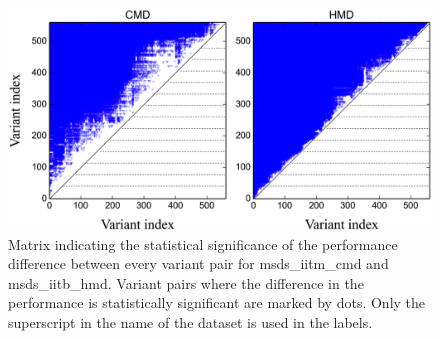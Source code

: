 \begin{figure}
	\begin{center}
		\includegraphics[width=\figSizeEightyFive]{ch06_patterns/figures/SimilarityEvaluation/StatisticalDiff.png}
	\end{center}
	\caption[Matrix indicating the statistical significance of the performance difference between different method variants]{Matrix indicating the statistical significance of the performance difference between every variant pair for \acrshort{msds_iitm_cmd} and \acrshort{msds_iitb_hmd}. Variant pairs where the difference in the performance is statistically significant are marked by dots. Only the superscript in the name of the dataset is used in the labels.}
	\label{fig:patterns_statistical_significance_similarity_evaluation}
\end{figure}


